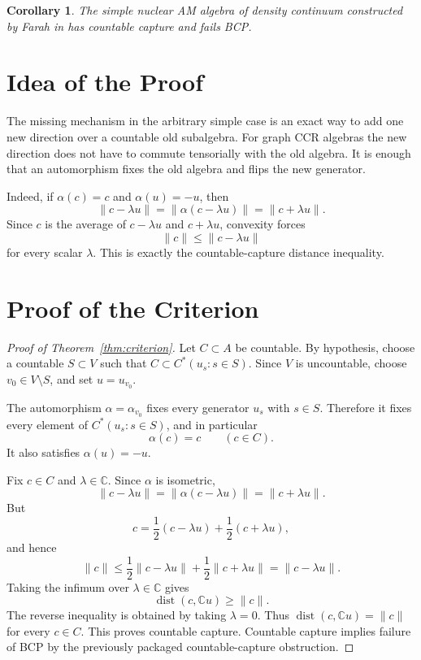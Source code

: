\documentclass[11pt]{article}
\newtheorem{corollary}{Corollary}
\newcommand{\C}{\mathbb C}
\newcommand{\dist}{\operatorname{dist}}
\begin{document}
\begin{corollary}
\label{cor:farah}
The simple nuclear AM algebra of density continuum constructed by Farah in
\cite{FarahCCR} has countable capture and fails BCP.
\end{corollary}

\section*{Idea of the Proof}

The missing mechanism in the arbitrary simple case is an exact way to add one
new direction over a countable old subalgebra.  For graph CCR algebras the
new direction does not have to commute tensorially with the old algebra.  It
is enough that an automorphism fixes the old algebra and flips the new
generator.

Indeed, if \(\alpha(c)=c\) and \(\alpha(u)=-u\), then
\[
        \|c-\lambda u\|=\|\alpha(c-\lambda u)\|=\|c+\lambda u\|.
\]
Since \(c\) is the average of \(c-\lambda u\) and \(c+\lambda u\), convexity
forces
\[
        \|c\|\le \|c-\lambda u\|
\]
for every scalar \(\lambda\).  This is exactly the countable-capture
distance inequality.

\section*{Proof of the Criterion}

\begin{proof}[Proof of Theorem~\ref{thm:criterion}]
Let \(C\subset A\) be countable.  By hypothesis, choose a countable
\(S\subset V\) such that \(C\subset C^*(u_s:s\in S)\).  Since \(V\) is
uncountable, choose \(v_0\in V\setminus S\), and set \(u=u_{v_0}\).

The automorphism \(\alpha=\alpha_{v_0}\) fixes every generator \(u_s\) with
\(s\in S\).  Therefore it fixes every element of \(C^*(u_s:s\in S)\), and
in particular
\[
        \alpha(c)=c\qquad(c\in C).
\]
It also satisfies \(\alpha(u)=-u\).

Fix \(c\in C\) and \(\lambda\in\C\).  Since \(\alpha\) is isometric,
\[
        \|c-\lambda u\|
        =
        \|\alpha(c-\lambda u)\|
        =
        \|c+\lambda u\|.
\]
But
\[
        c=\frac12(c-\lambda u)+\frac12(c+\lambda u),
\]
and hence
\[
        \|c\|
        \le
        \frac12\|c-\lambda u\|+\frac12\|c+\lambda u\|
        =
        \|c-\lambda u\|.
\]
Taking the infimum over \(\lambda\in\C\) gives
\[
        \dist(c,\C u)\ge \|c\|.
\]
The reverse inequality is obtained by taking \(\lambda=0\).  Thus
\(\dist(c,\C u)=\|c\|\) for every \(c\in C\).  This proves countable
capture.  Countable capture implies failure of BCP by the previously
packaged countable-capture obstruction.
\end{proof}
\end{document}
